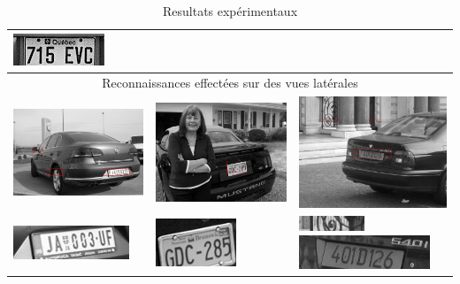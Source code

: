 \documentclass[a4paper,10pt,twocolumn]{article}
\begin{document}
\begin{table}[ht]
\begin{tabular}{|m{150pt}|m{150pt}|m{150pt}|}
	  \includegraphics[scale=1]{img/plate_2.png}\tabularnewline
	  \hline
	  \multicolumn{3}{|c|}{Reconnaissances effectées sur des vues latérales}\\
	  \hline
	  \includegraphics[width=150pt]{img/plate_detect_3.png}&
	  \includegraphics[width=150pt]{img/plate_detect_4.png}&
	  \includegraphics[width=150pt]{img/plate_detect_5.png}\tabularnewline
	  \includegraphics[scale=1]{img/plate_3.png}&
	  \includegraphics[scale=1]{img/plate_4.png}&
	  \includegraphics[scale=1]{img/plate_5_0.png} \newline
	  \includegraphics[scale=1]{img/plate_5_1.png}\tabularnewline
	  \hline
	\end{tabular}
	\caption{Resultats expérimentaux\label{result}}
\end{table}
\end{document}
